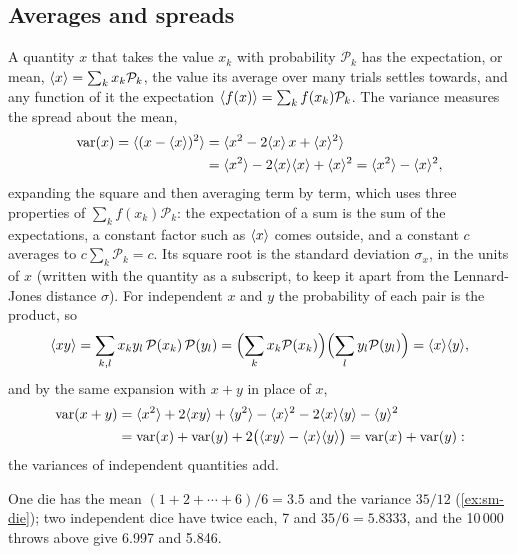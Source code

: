 \subsection*{Averages and spreads}

\begin{toolbox}
A quantity $x$ that takes the value $x_k$ with probability $\mathcal{P}_k$
has the expectation, or mean, $\langle x \rangle = \sum_kx_k\mathcal{P}_k$, the value
its average over many trials settles towards, and any function of it the
expectation $\langle f(x) \rangle = \sum_kf(x_k)\mathcal{P}_k$. The variance
measures the spread about the mean,
\begin{align*}
   \operatorname{var}(x) = \langle (x - \langle x \rangle)^2 \rangle
   &= \langle x^2 - 2\langle x \rangle\,x + \langle x \rangle^2 \rangle\\
   &= \langle x^2 \rangle - 2\langle x \rangle\langle x \rangle + \langle x \rangle^2 = \langle x^2 \rangle - \langle x \rangle^2 ,
\end{align*}
expanding the square and then averaging term by term, which uses three
properties of $\sum_kf(x_k)\mathcal{P}_k$: the expectation of a sum is the
sum of the expectations, a constant factor such as $\langle x \rangle$ comes
outside, and a constant $c$ averages to $c\sum_k\mathcal{P}_k = c$. Its
square root is the standard deviation $\sigma_x$, in the units of
$x$ (written with the quantity as a subscript, to keep it apart from the
Lennard-Jones distance $\sigma$). For independent $x$ and $y$ the
probability of each pair is the product, so
\begin{equation*}
   \langle xy \rangle = \sum_{k,l}x_ky_l\,\mathcal{P}(x_k)\,\mathcal{P}(y_l)
   = \Bigl(\sum_kx_k\mathcal{P}(x_k)\Bigr)\Bigl(\sum_ly_l\mathcal{P}(y_l)\Bigr)
   = \langle x \rangle\langle y \rangle ,
\end{equation*}
and by the same expansion with $x + y$ in place of $x$,
\begin{align*}
   \operatorname{var}(x + y) &= \langle x^2 \rangle + 2\langle xy \rangle + \langle y^2 \rangle
   - \langle x \rangle^2 - 2\langle x \rangle\langle y \rangle - \langle y \rangle^2\\
   &= \operatorname{var}(x) + \operatorname{var}(y)
   + 2\bigl(\langle xy \rangle - \langle x \rangle\langle y \rangle\bigr)
   = \operatorname{var}(x) + \operatorname{var}(y) :
\end{align*}
the variances of independent quantities add.
\end{toolbox}

One die has the mean $(1 + 2 + \dotsb + 6)/6 = 3.5$ and the variance
$35/12$ (\cref{ex:sm-die}); two independent dice have twice each, 7 and
$35/6 = 5.8333$, and the 10\,000 throws above give 6.997 and 5.846.

